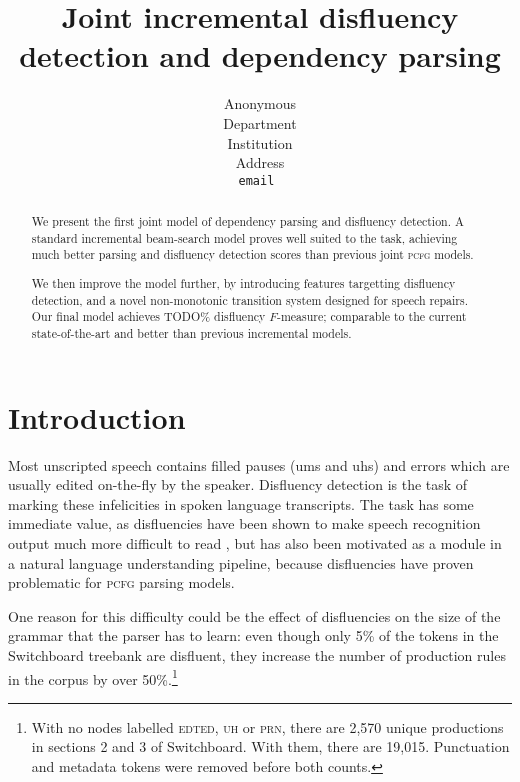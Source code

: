 \documentclass[11pt,letterpaper]{article}
\title{Joint incremental disfluency detection and dependency parsing}
\author{
	Anonymous\\
  	Department\\
  	Institution\\
  	Address\\
  {\tt \small email }\\
}
\date{}
\newcommand{\pcfg}{\textsc{pcfg}\xspace}
\begin{document}
\maketitle
\begin{abstract}

    We present the first joint model of dependency parsing and
    disfluency detection. A standard incremental beam-search model
    proves well suited to the task, achieving much better parsing and disfluency
    detection scores than previous joint \pcfg models.

We then improve the model further, by introducing features targetting disfluency
detection, and a novel non-monotonic transition system designed for speech repairs.
Our final model achieves TODO\% disfluency $F$-measure; comparable to the current
state-of-the-art and better than previous incremental models.

\end{abstract}

\section{Introduction}

Most unscripted speech contains filled pauses (ums and uhs) and errors which are
usually edited on-the-fly by the speaker. Disfluency detection is the task of
marking these infelicities in spoken language transcripts. The task has some
immediate value, as disfluencies have been shown to make speech recognition output
much more difficult to read \citep{jones:03}, but has also been motivated as
a module in a natural language understanding pipeline, because disfluencies have
proven problematic for \pcfg parsing models.

One reason for this difficulty could be the effect of disfluencies on the size
of the grammar that the parser has to learn: even though only 5\% of the tokens
in the Switchboard treebank \citep{marcus:93} are disfluent, they increase
the number of production rules in the corpus by over 50\%.\footnote{With
no nodes labelled \textsc{edted}, \textsc{uh} or \textsc{prn}, there are
2,570 unique productions in sections 2 and 3 of Switchboard. With them,
there are 19,015. Punctuation and metadata tokens were removed before both counts.}

\end{document}
